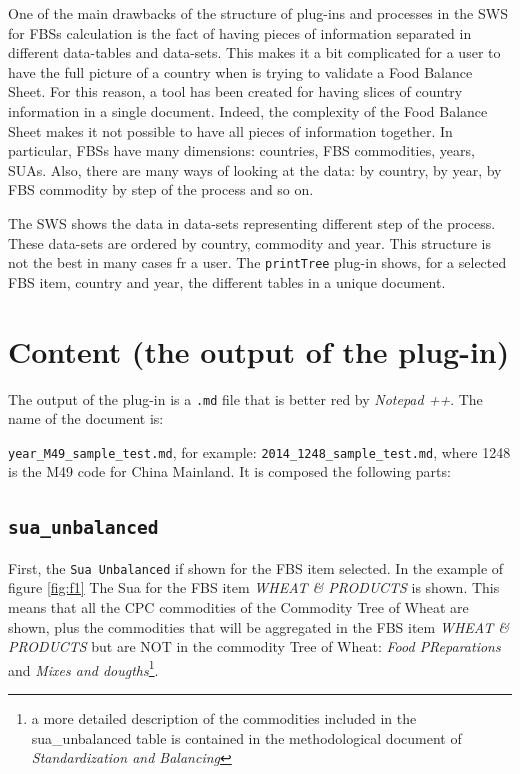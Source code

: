 \documentclass[]{article}
\let\rmarkdownfootnote\footnote%
\def\footnote{\protect\rmarkdownfootnote}
\begin{document}
One of the main drawbacks of the structure of plug-ins and processes in
the SWS for FBSs calculation is the fact of having pieces of information
separated in different data-tables and data-sets. This makes it a bit
complicated for a user to have the full picture of a country when is
trying to validate a Food Balance Sheet. For this reason, a tool has
been created for having slices of country information in a single
document. Indeed, the complexity of the Food Balance Sheet makes it not
possible to have all pieces of information together. In particular, FBSs
have many dimensions: countries, FBS commodities, years, SUAs. Also,
there are many ways of looking at the data: by country, by year, by FBS
commodity by step of the process and so on.

The SWS shows the data in data-sets representing different step of the
process. These data-sets are ordered by country, commodity and year.
This structure is not the best in many cases fr a user. The
\texttt{printTree} plug-in shows, for a selected FBS item, country and
year, the different tables in a unique document.

\section{Content (the output of the
plug-in)}\label{content-the-output-of-the-plug-in}

The output of the plug-in is a \texttt{.md} file that is better red by
\emph{Notepad ++}. The name of the document is:

\texttt{year\_M49\_sample\_test.md}, for example:
\texttt{2014\_1248\_sample\_test.md}, where 1248 is the M49 code for
China Mainland. It is composed the following parts:

\subsection{\texorpdfstring{\texttt{sua\_unbalanced}}{sua\_unbalanced}}\label{sua_unbalanced}

First, the \texttt{Sua\ Unbalanced} if shown for the FBS item selected.
In the example of figure \ref{fig:f1} The Sua for the FBS item
\emph{WHEAT \& PRODUCTS} is shown. This means that all the CPC
commodities of the Commodity Tree of Wheat are shown, plus the
commodities that will be aggregated in the FBS item \emph{WHEAT \&
PRODUCTS} but are NOT in the commodity Tree of Wheat: \emph{Food
PReparations} and \emph{Mixes and dougths}\footnote{a more detailed
  description of the commodities included in the sua\_unbalanced table
  is contained in the methodological document of \emph{Standardization
  and Balancing}}.
\end{document}

